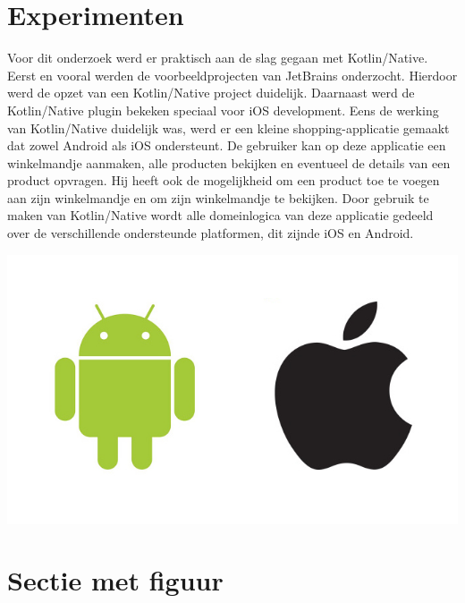 \documentclass[a0,portrait]{a0poster}
\begin{document}
\begin{multicols}{2}
\color{Black} %
\color{HoGentAccent1} 
\section*{Experimenten}
\color{black}
Voor dit onderzoek werd er praktisch aan de slag gegaan met Kotlin/Native. Eerst en vooral werden de voorbeeldprojecten van JetBrains onderzocht. Hierdoor werd de opzet van een Kotlin/Native project duidelijk. Daarnaast werd de Kotlin/Native plugin bekeken speciaal voor iOS development. Eens de werking van Kotlin/Native duidelijk was, werd er een kleine shopping-applicatie gemaakt dat zowel Android als iOS ondersteunt. De gebruiker kan op deze applicatie een winkelmandje aanmaken, alle producten bekijken en eventueel de details van een product opvragen. Hij heeft ook de mogelijkheid om een product toe te voegen aan zijn winkelmandje en om zijn winkelmandje te bekijken. Door gebruik te maken van Kotlin/Native wordt alle domeinlogica van deze applicatie gedeeld over de verschillende ondersteunde platformen, dit zijnde iOS en Android.

\begin{center}\vspace{1cm}
	\includegraphics[width=1.0\linewidth]{figures/apple-android.jpeg}
\end{center}\vspace{1cm}

\iffalse
\color{HoGentAccent1} 
\section*{Sectie met figuur}
\color{black}



\end{multicols}
\end{document}
